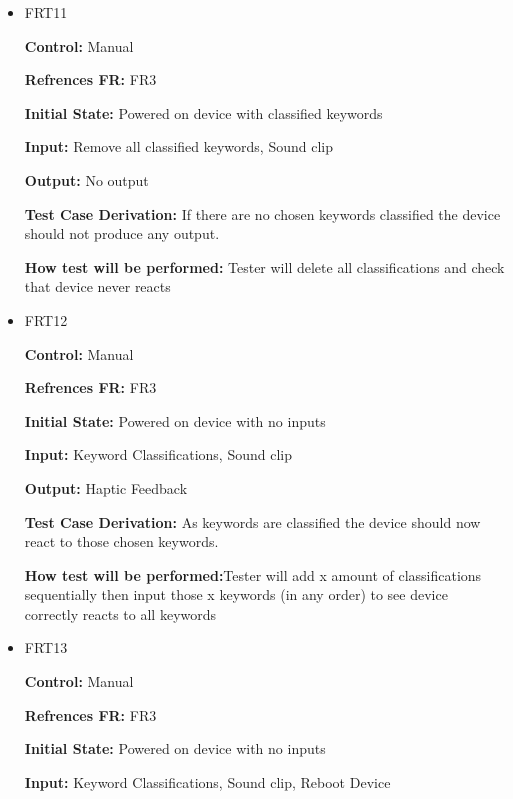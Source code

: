 \documentclass[12pt, titlepage]{article}
\begin{document}
\begin{itemize}

\item{FRT11}

\textbf{Control:} Manual 

\textbf{Refrences FR:} FR3 					

\textbf{Initial State:} Powered on device with classified keywords
					
\textbf{Input:} Remove all classified keywords, Sound clip
					
\textbf{Output:} No output

\textbf{Test Case Derivation:} If there are no chosen keywords classified the device should not produce any output.
					
\textbf{How test will be performed:} Tester will delete all classifications and check that device never reacts


\item{FRT12}

\textbf{Control:} Manual

\textbf{Refrences FR:} FR3 					

\textbf{Initial State:} Powered on device with no inputs
					
\textbf{Input:} Keyword Classifications, Sound clip
					
\textbf{Output:} Haptic Feedback

\textbf{Test Case Derivation:} As keywords are classified the device should now react to those chosen keywords.
					
\textbf{How test will be performed:}Tester will add x amount of classifications sequentially then input those x keywords (in any order) to see device correctly reacts to all keywords


\item{FRT13}

\textbf{Control:} Manual

\textbf{Refrences FR:} FR3 					

\textbf{Initial State:} Powered on device with no inputs
					
\textbf{Input:} Keyword Classifications, Sound clip, Reboot Device
					

\end{itemize}
\end{document}

